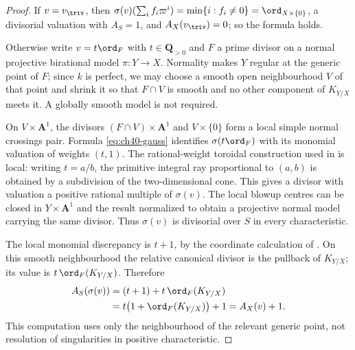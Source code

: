 \begin{proof}
If $v=v_{\triv}$, then $\sigma(v)(\sum_if_i\varpi^i)=\min\{i:f_i\ne0\}
=\ord_{X\times\{0\}}$, a divisorial valuation with
$A_S=1$, and $A_X(v_{\triv})=0$; so the formula holds.

Otherwise write $v=t\ord_F$ with $t\in\mathbf Q_{>0}$ and $F$ a
prime divisor on a normal projective birational model $\pi:Y\to X$.
Normality makes $Y$ regular at the generic point of $F$; since $k$ is
perfect, we may choose a smooth open neighbourhood $V$ of that point
and shrink it so that $F\cap V$ is smooth and no other component of
$K_{Y/X}$ meets it.  A globally smooth model is not required.

On $V\times\mathbf A^1$, the divisors $(F\cap V)\times\mathbf A^1$
and $V\times\{0\}$ form a local simple normal crossings pair.
Formula \eqref{eq:ch40-gauss} identifies $\sigma(t\ord_F)$ with its
monomial valuation of weights $(t,1)$.  The rational-weight toroidal
construction used in  is local:
writing $t=a/b$, the primitive integral ray proportional to $(a,b)$
is obtained by a subdivision of the two-dimensional cone.  This gives
a divisor with valuation a positive rational multiple of $\sigma(v)$.
The local blowup centres can be closed in $Y\times\mathbf A^1$ and the
result normalized to obtain a projective normal model carrying the same
divisor.  Thus $\sigma(v)$ is divisorial over $S$ in every characteristic.

The local monomial discrepancy is $t+1$, by the coordinate calculation
of .  On this smooth neighbourhood
the relative canonical divisor is the pullback of $K_{Y/X}$; its value
is $t\,\ord_F(K_{Y/X})$.  Therefore
\[
 \begin{aligned}
 A_S(\sigma(v))
 &=(t+1)+t\,\ord_F(K_{Y/X})\\
 &=t\bigl(1+\ord_F(K_{Y/X})\bigr)+1
 =A_X(v)+1 .
 \end{aligned}
\]
This computation uses only the neighbourhood of the relevant generic
point, not resolution of singularities in positive characteristic.
\end{proof}

